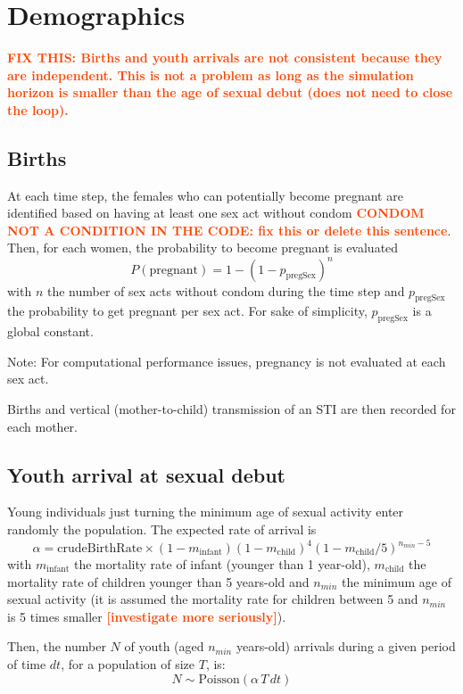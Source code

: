 \documentclass[11pt, onecolumn]{article}
\newcommand{\warning}[1]{\textbf{\textcolor{OrangeRed}{#1}}}
\begin{document}
\section{Demographics}

\warning{FIX THIS: Births and youth arrivals are not consistent because they are independent. This is not a problem as long as the simulation horizon is smaller than the age of sexual debut (does not need to close the loop).}

\subsection{Births}

At each time step, the females who can potentially become pregnant are identified based on having at least one sex act without condom \warning{CONDOM NOT A CONDITION IN THE CODE: fix this or delete this sentence}. Then, for each women, the probability to become pregnant is evaluated
$$P(\mathrm{pregnant}) =  1 - (1-p_{\mathrm{pregSex}})^n$$
with $n$ the number of sex acts without condom during the time step and $p_{\mathrm{pregSex}}$ the probability to get pregnant per sex act. For sake of simplicity, $p_{\mathrm{pregSex}}$ is a global constant.

Note: For computational performance issues, pregnancy is not evaluated at each sex act.

Births and vertical (mother-to-child) transmission of an STI are then recorded for each mother. 

\subsection{Youth arrival at sexual debut}

Young individuals just turning the minimum age of sexual activity enter randomly the population. The expected rate of arrival is 
$$ \alpha = \mathrm{crudeBirthRate}\times(1-m_\mathrm{infant})(1-m_{\mathrm{child}})^4 (1-m_{\mathrm{child}}/5)^{n_{min}-5} $$
with $m_\mathrm{infant}$ the mortality rate of infant (younger than 1 year-old), $m_\mathrm{child}$ the mortality rate of children younger than 5 years-old and $n_{min}$ the minimum age of sexual activity (it is assumed the mortality rate for children between 5 and $n_{min}$ is 5 times smaller \warning{[investigate more seriously]}).

Then, the number $N$ of youth (aged $n_{min}$ years-old) arrivals during a given period of time $dt$, for a population of size $T$, is:
$$ N \sim \mathrm{Poisson} ( \alpha \, T \,dt)$$
\end{document}
